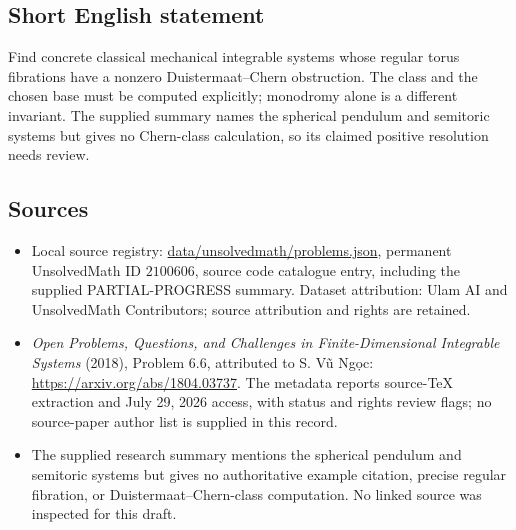 \documentclass[11pt]{article}
\begin{document}
\subsection{Short English statement}
Find concrete classical mechanical integrable systems whose regular torus fibrations have a nonzero Duistermaat--Chern obstruction. The class and the chosen base must be computed explicitly; monodromy alone is a different invariant. The supplied summary names the spherical pendulum and semitoric systems but gives no Chern-class calculation, so its claimed positive resolution needs review.
\subsection{Sources}
\begin{itemize}
\item Local source registry: \url{data/unsolvedmath/problems.json}, permanent UnsolvedMath ID $2100606$, source code catalogue entry, including the supplied PARTIAL-PROGRESS summary. Dataset attribution: Ulam AI and UnsolvedMath Contributors; source attribution and rights are retained.
\item \emph{Open Problems, Questions, and Challenges in Finite-Dimensional Integrable Systems} (2018), Problem 6.6, attributed to S. Vũ Ngọc: \url{https://arxiv.org/abs/1804.03737}. The metadata reports source-TeX extraction and July 29, 2026 access, with status and rights review flags; no source-paper author list is supplied in this record.
\item The supplied research summary mentions the spherical pendulum and semitoric systems but gives no authoritative example citation, precise regular fibration, or Duistermaat--Chern-class computation. No linked source was inspected for this draft.
\end{itemize}
\end{document}
